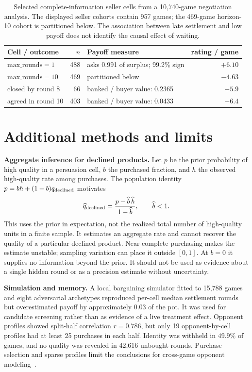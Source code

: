\documentclass{article}
\begin{document}
\begin{table}[H]
\centering\small
\caption{Selected complete-information seller cells from a 10,740-game
negotiation analysis. The displayed seller cohorts contain 957 games; the
469-game horizon-10 cohort is partitioned below. The association between late
settlement and low payoff does not identify the causal effect of waiting.}
\label{tab:endgame}
\begin{tabular}{@{}lrlr@{}}
\toprule
Cell / outcome & $n$ & Payoff measure & rating / game\\
\midrule
$\mathrm{max\_rounds}=1$ & 488 & asks 0.991 of surplus; 99.2\% sign & $+6.10$\\
$\mathrm{max\_rounds}=10$ & 469 & partitioned below & $-4.63$\\
\quad closed by round 8 & 66 & banked / buyer value: 0.2365 & $+5.9$\\
\quad agreed in round 10 & 403 & banked / buyer value: 0.0433 & $-6.4$\\
\bottomrule
\end{tabular}
\end{table}

\section{Additional methods and limits}
\label{app:lim}
\textbf{Aggregate inference for declined products.} Let $p$ be the prior
probability of high quality in a persuasion cell, $b$ the purchased fraction,
and $h$ the observed high-quality rate among purchases. The population identity
$p=bh+(1-b)q_{\rm declined}$ motivates
\[
\widehat q_{\rm declined}=\frac{p-\widehat b\,\widehat h}{1-\widehat b},
\qquad \widehat b<1.
\]
This uses the prior in expectation, not the realized total number of high-quality
units in a finite sample. It estimates an aggregate rate and cannot recover the
quality of a particular declined product. Near-complete purchasing makes the
estimate unstable; sampling variation can place it outside $[0,1]$. At $b=0$
it supplies no information beyond the prior. It should not be used as evidence
about a single hidden round or as a precision estimate without uncertainty.

\textbf{Simulation and memory.} A local bargaining simulator fitted to 15,788
games and eight adversarial archetypes reproduced per-cell median settlement
rounds but overestimated payoff by approximately 0.03 of the pot. It was used
for candidate screening rather than as evidence of a live treatment effect.
Opponent profiles showed split-half correlation $r=0.786$, but only 19
opponent-by-cell profiles had at least 25 purchases in each half. Identity was
withheld in 49.9\% of games, and no quality was revealed in 42,616 unbought
rounds. Purchase selection and sparse profiles limit the conclusions for
cross-game opponent modeling~\cite{baarslag2016survey}.
\end{document}
